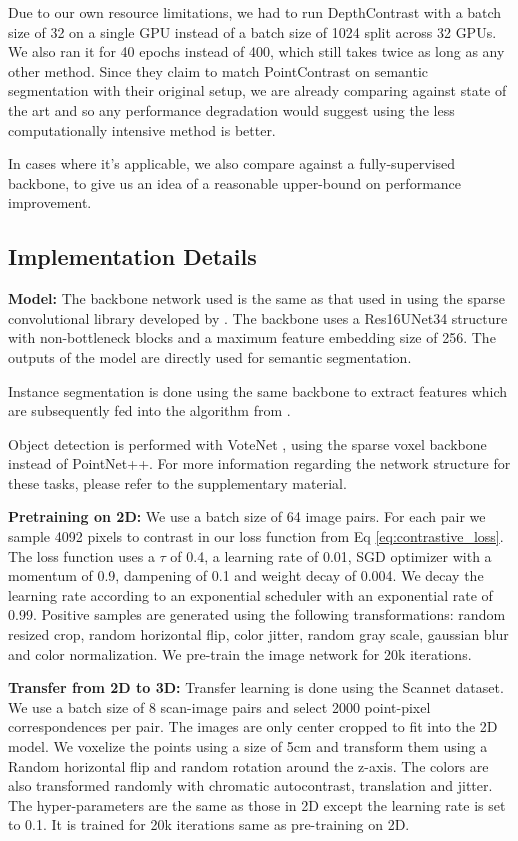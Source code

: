 \documentclass[10pt,twocolumn,letterpaper]{article}
\begin{document}
Due to our own resource limitations, we had to run DepthContrast with a batch size of 32 on a single GPU instead of a batch size of 1024 split across 32 GPUs. We also ran it for 40 epochs instead of 400, which still takes twice as long as any other method. Since they claim to match PointContrast on semantic segmentation with their original setup, we are already comparing against state of the art and so any performance degradation would suggest using the less computationally intensive method is better.

In cases where it's applicable, we also compare against a fully-supervised backbone, to give us an idea of a reasonable upper-bound on performance improvement.

\subsection{Implementation Details}
\label{sec:results:implementation}

\textbf{Model:} The backbone network used is the same as that used in \cite{xie2020pointcontrast, hou2021Exploring} using the sparse convolutional library developed by \cite{choy20194d}. The backbone uses a Res16UNet34 structure with non-bottleneck blocks and a maximum feature embedding size of 256. The outputs of the model are directly used for semantic segmentation.

Instance segmentation is done using the same backbone to extract features which are subsequently fed into the algorithm from \cite{jiang2020pointgroup}.

Object detection is performed with VoteNet \cite{qi2019deep}, using the sparse voxel backbone instead of PointNet++. For more information regarding the network structure for these tasks, please refer to the supplementary material.

\textbf{Pretraining on 2D:} We use a batch size of 64 image pairs. For each pair we sample 4092 pixels to contrast in our loss function from Eq \ref{eq:contrastive_loss}. The loss function uses a $\tau$ of 0.4, a learning rate of 0.01, SGD optimizer with a momentum of 0.9, dampening of 0.1 and weight decay of 0.004. We decay the learning rate according to an exponential scheduler with an exponential rate of 0.99. Positive samples are generated using the following transformations: random resized crop, random horizontal flip, color jitter, random gray scale, gaussian blur and color normalization. We pre-train the image network for 20k iterations.

\textbf{Transfer from 2D to 3D:} Transfer learning is done using the Scannet dataset. We use a batch size of 8 scan-image pairs and select 2000 point-pixel correspondences per pair. The images are only center cropped to fit into the 2D model. We voxelize the points using a size of 5cm and transform them using a Random horizontal flip and random rotation around the z-axis. The colors are also transformed randomly with chromatic autocontrast, translation and jitter. The hyper-parameters are the same as those in 2D except the learning rate is set to 0.1. It is trained for 20k iterations same as pre-training on 2D.
\end{document}
